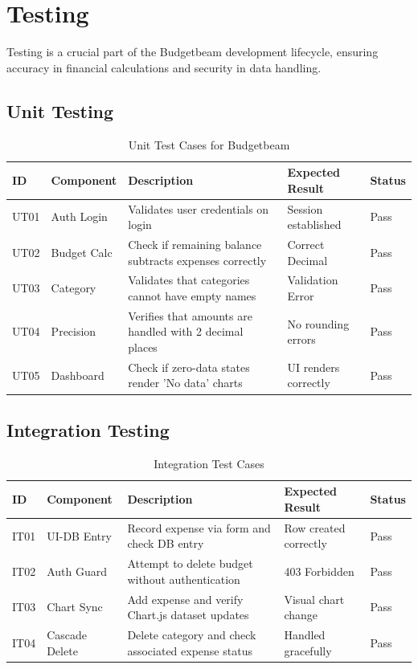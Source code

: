 \chapter{Testing}
Testing is a crucial part of the Budgetbeam development lifecycle, ensuring accuracy in financial calculations and security in data handling.

\section{Unit Testing}
\begin{longtable}{|l|l|p{5.5cm}|p{3.5cm}|l|}
\caption{Unit Test Cases for Budgetbeam} \\
\hline
\textbf{ID} & \textbf{Component} & \textbf{Description} & \textbf{Expected Result} & \textbf{Status} \\ \hline
UT01 & Auth Login & Validates user credentials on login & Session established & Pass \\ \hline
UT02 & Budget Calc & Check if remaining balance subtracts expenses correctly & Correct Decimal & Pass \\ \hline
UT03 & Category & Validates that categories cannot have empty names & Validation Error & Pass \\ \hline
UT04 & Precision & Verifies that amounts are handled with 2 decimal places & No rounding errors & Pass \\ \hline
UT05 & Dashboard & Check if zero-data states render 'No data' charts & UI renders correctly & Pass \\ \hline
\end{longtable}

\section{Integration Testing}
\begin{longtable}{|l|l|p{5.5cm}|p{3.5cm}|l|}
\caption{Integration Test Cases} \\
\hline
\textbf{ID} & \textbf{Component} & \textbf{Description} & \textbf{Expected Result} & \textbf{Status} \\ \hline
IT01 & UI-DB Entry & Record expense via form and check DB entry & Row created correctly & Pass \\ \hline
IT02 & Auth Guard & Attempt to delete budget without authentication & 403 Forbidden & Pass \\ \hline
IT03 & Chart Sync & Add expense and verify Chart.js dataset updates & Visual chart change & Pass \\ \hline
IT04 & Cascade Delete & Delete category and check associated expense status & Handled gracefully & Pass \\ \hline
\end{longtable}

